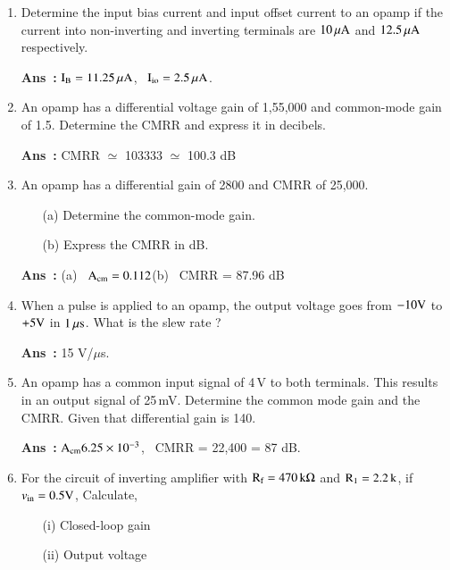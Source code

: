 \begin{enumerate}
\renewcommand{\labelenumi}{(\theenumi)}
\item Determine the input bias current and input offset current to an opamp if the current into non-inverting and inverting terminals are $10\,\mu\textrm{A}$ and $12.5\,\mu\textrm{A}$ respectively.

\smallskip
\noindent
{\bf Ans~:} $\textrm{I}_{\textrm{B}}=11.25\,\mu\textrm{A}$, \ $\textrm{I}_{\text{io}}=2.5\,\mu\textrm{A}$.

\item An opamp has a differential voltage gain of 1,55,000 and common-mode gain of 1.5. Determine the CMRR and express it in decibels.

\smallskip
\noindent
{\bf Ans~:} CMRR $\simeq$ 103333 $\simeq$ 100.3 dB

\item An opamp has a differential gain of 2800 and CMRR of 25,000.
\begin{itemize}
\item[(a)] Determine the common-mode gain.

\item[(b)] Express the CMRR in dB.
\end{itemize}

\smallskip
\noindent
{\bf Ans~:} (a)~ $\textrm{A}_{\text{cm}}=0.112$\quad (b)~ CMRR = 87.96 dB

\item When a pulse is applied to an opamp, the output voltage goes from $-10\textrm{V}$ to $+5\textrm{V}$ in $1\,\mu\textrm{s}$. What is the slew rate ?

\smallskip
\noindent
{\bf Ans~:} 15 V/$\mu$s.

\item An opamp has a common input signal of 4\,V to both terminals. This results in an output signal of 25\,mV. Determine the common mode gain and the CMRR. Given that differential gain is 140.

\smallskip
\noindent
{\bf Ans~:} $\textrm{A}_{\text{cm}}6.25\times 10^{-3}$, \ CMRR = 22,400 = 87 dB.

\item For the circuit of inverting amplifier with $\textrm{R}_{\textrm{f}}=470\,\textrm{k}\Omega$ and $\textrm{R}_{1}=2.2\,\textrm{k}$, if $v_{\text{in}}=0.5\textrm{V}$, Calculate,
\begin{itemize}
\item[(i)] Closed-loop gain

\item[(ii)] Output voltage
\end{itemize}


\end{enumerate}
